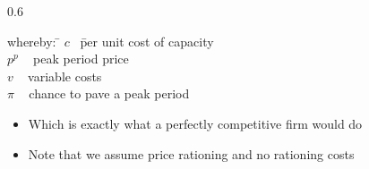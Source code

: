 \begin{frame}
\begin{columns}
\begin{column} {0.6\textwidth}
{\small
\begin{tabbing}
whereby: \= $c$ \  \= per unit cost of capacity \\
\> $p^p$   \    \> peak period price  \\
\> $v$    \   \> variable costs \\
\> $\pi$    \    \> chance to pave a peak period
\end{tabbing}}

\begin{itemize}
\item Which is exactly what a perfectly competitive firm would do
\end {itemize}

\begin{itemize}
\item Note that we assume price rationing and no rationing costs
\end {itemize}

\end{column}
\end{columns}

\end{frame}
